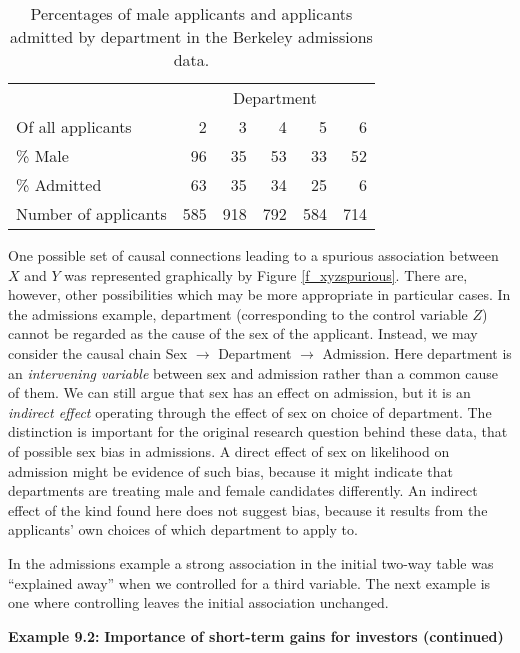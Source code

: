 \begin{table}
\caption{Percentages of male applicants and applicants admitted by
department in the Berkeley admissions data.}
\label{t_berkeley3}
\begin{center}
\begin{tabular}{|l|rrrrr|}\hline
& \multicolumn{5}{|c|}{Department}\\
Of all applicants & 2 & 3 & 4 & 5 & 6 \\ \hline
\% Male & 96 & 35 & 53 & 33 & 52 \\
\% Admitted & 63 & 35 & 34 & 25 & 6 \\
\hline
Number of applicants & 585 & 918 & 792 & 584 & 714 \\
\hline
\end{tabular}
\end{center}
\vspace*{-2ex}
\end{table}

One possible set of causal connections leading to a spurious association
between $X$ and $Y$ was represented graphically by Figure
\ref{f_xyzspurious}. There are, however, other possibilities which may
be more appropriate in particular cases. In the admissions example,
department (corresponding to the control variable $Z$) cannot be
regarded as the cause of the sex of the applicant. Instead, we may
consider the causal chain Sex $\longrightarrow$ Department
$\longrightarrow$ Admission. Here department is an \emph{intervening
variable} between sex and admission rather than a common cause of them.
We can still argue that sex has an effect on admission, but it is an
\emph{indirect effect} operating through the effect of sex on choice of
department. The distinction is important for the original research question
behind these data, that of possible sex bias in admissions.
A direct effect of sex on likelihood on admission might be evidence of
such bias, because it might indicate that departments are treating male
and female candidates differently. An indirect effect of the kind found
here does not suggest bias, because it results from the applicants' own
choices of which department to apply to.

In the admissions example a strong association in the initial two-way
table was ``explained away'' when we controlled for a third variable.
The next example is one where controlling leaves the initial association
unchanged.

\textbf{Example 9.2:}
\textbf{Importance of short-term gains
for investors (continued)}

